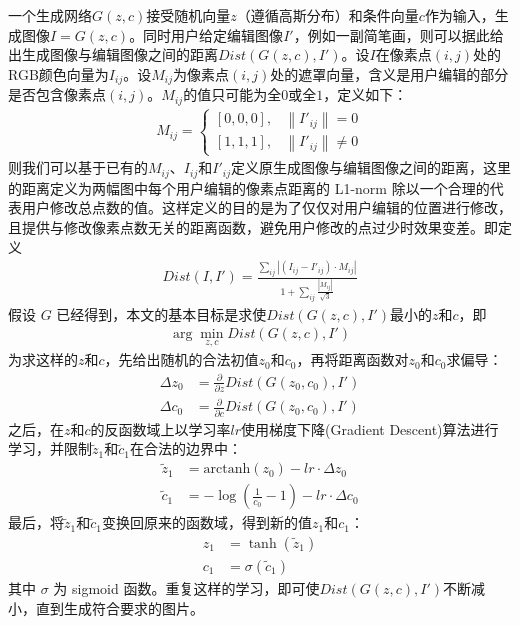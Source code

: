 \documentclass[a4paper,12pt,UTF8]{ctexart}
\newcommand{\norm}[1]{\left\lVert#1\right\rVert}
\begin{document}
一个生成网络$G(z, c)$接受随机向量$z$（遵循高斯分布）和条件向量$c$作为输入，生成图像$I = G(z, c)$。同时用户给定编辑图像$I'$，例如一副简笔画，则可以据此给出生成图像与编辑图像之间的距离$Dist(G(z, c), I')$。设$I$在像素点$(i, j)$处的RGB颜色向量为$I_{ij}$。设$M_{ij}$为像素点$(i, j)$处的遮罩向量，含义是用户编辑的部分是否包含像素点$(i, j)$。$M_{ij}$的值只可能为全$0$或全$1$，定义如下：
%
\begin{align}
  M_{ij} =
  \begin{cases}
    [0, 0, 0],   &  \text{$\norm{I'_{ij}} = 0$} \\
    [1, 1, 1],   &  \text{$\norm{I'_{ij}} \neq 0$}
  \end{cases}
\end{align}
%
则我们可以基于已有的$M_{ij}$、$I_{ij}$和$I'_{ij}$定义原生成图像与编辑图像之间的距离，这里的距离定义为两幅图中每个用户编辑的像素点距离的 L1-norm 除以一个合理的代表用户修改总点数的值。这样定义的目的是为了仅仅对用户编辑的位置进行修改，且提供与修改像素点数无关的距离函数，避免用户修改的点过少时效果变差。即定义
%
\begin{align}
  Dist(I, I') = \frac{\sum_{ij} |(I_{ij} - I'_{ij}) \cdot M_{ij}|}{1 + \sum_{ij} \frac{|M_{ij}|}{\sqrt 3}}
\end{align}
%
假设 $G$ 已经得到，本文的基本目标是求使$Dist(G(z, c), I')$最小的$z$和$c$，即
%
\begin{align}
  \arg\min_{z, c} Dist(G(z, c), I')
\end{align}
%
为求这样的$z$和$c$，先给出随机的合法初值$z_{0}$和$c_{0}$，再将距离函数对$z_{0}$和$c_{0}$求偏导：
%
\begin{align}
  \Delta z_{0} & = \frac{\partial}{\partial z} Dist(G(z_{0}, c_{0}), I') \\
  \Delta c_{0} & = \frac{\partial}{\partial c} Dist(G(z_{0}, c_{0}), I')
\end{align}
%
之后，在$z$和$c$的反函数域上以学习率$lr$使用梯度下降(Gradient Descent)算法进行学习，并限制$\tilde z_{1}$和$\tilde c_{1}$在合法的边界中：
%
\begin{align}
  \tilde z_{1} & = \mathrm{arctanh}(z_{0}) - lr \cdot \Delta z_{0} \\
  \tilde c_{1} & = - \log \left(\frac{1}{c_{0}} - 1\right) - lr \cdot \Delta c_{0}
\end{align}
%
最后，将$\tilde z_{1}$和$\tilde c_{1}$变换回原来的函数域，得到新的值$z_{1}$和$c_{1}$：
%
\begin{align}
  z_{1} & = \tanh (\tilde z_{1}) \\
  c_{1} & = \sigma(\tilde c_{1})
\end{align}
%
其中 $\sigma$ 为 sigmoid 函数。重复这样的学习，即可使$Dist(G(z, c), I')$不断减小，直到生成符合要求的图片。
\end{document}
